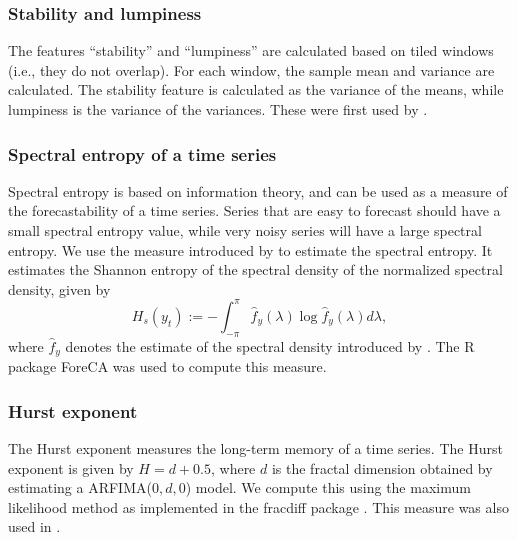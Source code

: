 \documentclass[11pt,a4paper,]{article}
\begin{document}
\hypertarget{stability-and-lumpiness}{%
\subsubsection*{Stability and lumpiness}\label{stability-and-lumpiness}}

The features ``stability'' and ``lumpiness'' are calculated based on tiled windows (i.e., they do not overlap). For each window, the sample mean and variance are calculated. The stability feature is calculated as the variance of the means, while lumpiness is the variance of the variances. These were first used by \textcite{hyndman2015large}.

\hypertarget{spectral-entropy-of-a-time-series}{%
\subsubsection*{Spectral entropy of a time series}\label{spectral-entropy-of-a-time-series}}

Spectral entropy is based on information theory, and can be used as a measure of the forecastability of a time series. Series that are easy to forecast should have a small spectral entropy value, while very noisy series will have a large spectral entropy. We use the measure introduced by \textcite{goerg2013forecastable} to estimate the spectral entropy. It estimates the Shannon entropy of the spectral density of the normalized spectral density, given by
\[
  H_{s}(y_t):=-\int_{-\pi}^{\pi}\hat f_y(\lambda)\log \hat f_y({\lambda})d\lambda,
\]
where \(\hat{f}_y\) denotes the estimate of the spectral density introduced by \textcite{nuttall1982spectral}. The R package ForeCA \autocite{Foreca} was used to compute this measure.

\hypertarget{hurst-exponent}{%
\subsubsection*{Hurst exponent}\label{hurst-exponent}}

The Hurst exponent measures the long-term memory of a time series. The Hurst exponent is given by \(H=d+0.5\), where \(d\) is the fractal dimension obtained by estimating a ARFIMA(\(0, d, 0\)) model. We compute this using the maximum likelihood method \autocite{haslett1989space} as implemented in the fracdiff package \autocite{fracdiff}. This measure was also used in \textcite{wang2009rule}.
\end{document}
